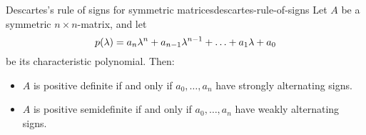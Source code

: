 \begin{proposition}{Descartes's rule of signs for symmetric matrices}{descartes-rule-of-signs}
  Let $A$ be a symmetric $n\times n$-matrix, and let
  \begin{equation*}
    p(\lambda) = a_n\lambda^n + a_{n-1}\lambda^{n-1} + \ldots + a_1\lambda + a_0
  \end{equation*}
  be its characteristic polynomial. Then:
  \begin{itemize}
  \item $A$ is positive definite if and only if $a_0,\ldots,a_n$ have
    strongly alternating signs.
  \item $A$ is positive semidefinite if and only if $a_0,\ldots,a_n$
    have weakly alternating signs.
  \end{itemize}
\end{proposition}

